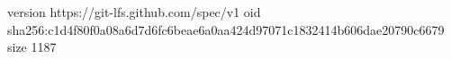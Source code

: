 version https://git-lfs.github.com/spec/v1
oid sha256:c1d4f80f0a08a6d7d6fc6beae6a0aa424d97071c1832414b606dae20790c6679
size 1187
